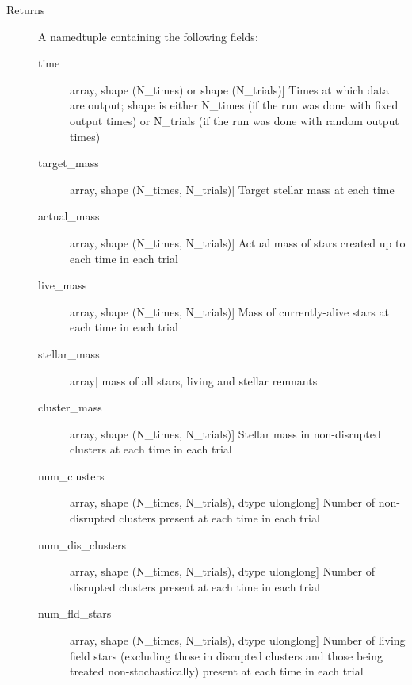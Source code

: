 \documentclass[letterpaper,10pt,english]{sphinxmanual}
\begin{document}
\begin{fulllineitems}
\begin{description}
\begin{description}
\end{description}

\item[{Returns}] \leavevmode
A namedtuple containing the following fields:
\begin{description}
\item[{time}] \leavevmode{[}array, shape (N\_times) or shape (N\_trials){]}
Times at which data are output; shape is either N\_times (if
the run was done with fixed output times) or N\_trials (if
the run was done with random output times)

\item[{target\_mass}] \leavevmode{[}array, shape (N\_times, N\_trials){]}
Target stellar mass at each time

\item[{actual\_mass}] \leavevmode{[}array, shape (N\_times, N\_trials){]}
Actual mass of stars created up to each time in each trial

\item[{live\_mass}] \leavevmode{[}array, shape (N\_times, N\_trials){]}
Mass of currently-alive stars at each time in each trial

\item[{stellar\_mass}] \leavevmode{[}array{]}
mass of all stars, living and stellar remnants

\item[{cluster\_mass}] \leavevmode{[}array, shape (N\_times, N\_trials){]}
Stellar mass in non-disrupted clusters at each time in each
trial

\item[{num\_clusters}] \leavevmode{[}array, shape (N\_times, N\_trials), dtype ulonglong{]}
Number of non-disrupted clusters present at each time in each
trial

\item[{num\_dis\_clusters}] \leavevmode{[}array, shape (N\_times, N\_trials), dtype ulonglong{]}
Number of disrupted clusters present at each time in each trial

\item[{num\_fld\_stars}] \leavevmode{[}array, shape (N\_times, N\_trials), dtype ulonglong{]}
Number of living field stars (excluding those in disrupted 
clusters and those being treated non-stochastically) present at
each time in each trial

\end{description}

\end{description}

\end{fulllineitems}
\end{document}
